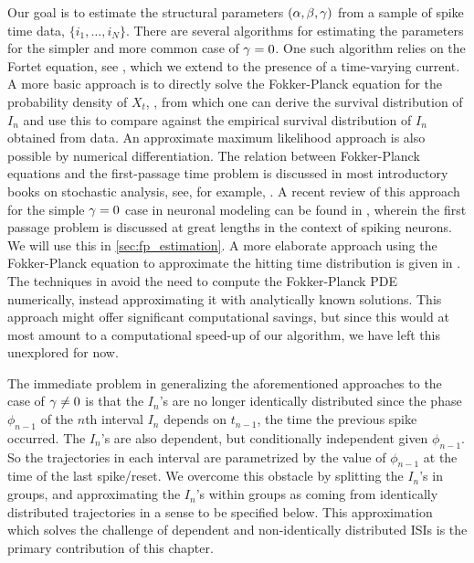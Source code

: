 Our goal is to estimate the structural parameters $({\alpha,\beta,{\gamma } })$ from a sample of
spike time data, $\{i_1,\ldots,i_N\}$. There are several algorithms for
estimating the parameters for the simpler and more common case of ${\gamma } = 0$. One
such algorithm relies on the Fortet equation, see
\cite{Ditlevsen2008,Ditlevsen2007}, which we extend to the presence of a
time-varying current. A more basic approach is to directly solve the
Fokker-Planck equation for the probability density of $X_t$,
\cite{Sirovich2011a,Paninski2004,Dong2011}, from which one can derive the
survival distribution of $I_n$ and use this to compare against the empirical
survival distribution of $I_n$ obtained from data. An approximate maximum
likelihood approach is also possible by numerical differentiation. The relation
between Fokker-Planck equations and the first-passage time problem is discussed
in most introductory books on stochastic analysis, see, for example,
\cite{Jacobs}. A recent review of this approach for the simple ${\gamma }=0$ case in
neuronal modeling can be found in \cite{Sirovich2011a}, wherein the first
passage problem is discussed at great lengths in the context of spiking neurons.
We will use this in \cref{sec:fp_estimation}. A more elaborate approach using
the Fokker-Planck equation to approximate the hitting time distribution is given
in \cite{Lo2006}. The techniques in \cite{Lo2006} avoid the need to compute the
Fokker-Planck PDE numerically, instead approximating it with analytically known
solutions. This approach might offer significant computational savings, but
since this would at most amount to a computational speed-up of our algorithm, we
have left this unexplored for now.


The immediate problem in generalizing the aforementioned approaches to the case
of ${\gamma } \neq 0$ is that the $I_n$'s are no longer identically distributed since
the phase $\phi_{n-1}$ of the $n$th interval $I_n$ depends on $t_{n-1}$, the
time the previous spike occurred. The $I_n$'s are also dependent, but conditionally
independent given $\phi_{n-1}$. So the trajectories in each interval are
parametrized by the value of $\phi_{n-1}$ at the time of the last spike/reset.
We overcome this obstacle by splitting the $I_n$'s in groups, and
approximating the $I_n$'s within groups as coming from identically
distributed trajectories in a sense to be specified below. This approximation
which solves the challenge of dependent and non-identically distributed ISIs is
the primary contribution of this chapter.


